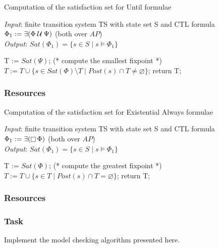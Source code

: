 \documentclass{article}
\begin{document}
\begin{algorithm}[H]
    \caption{Computation of the satisfaction set for Until formulae}
    \hspace*{\algorithmicindent} \emph{Input}: finite transition system TS with state set S and CTL formula $\Phi_1 := \exists (\Phi \mathbin{\mathcal{U}} \Psi)$ (both over $AP$) \\
    \hspace*{\algorithmicindent} \emph{Output}: $Sat(\Phi_1) = \{ s \in S \mid s \vDash \Phi_1 \}$
    \begin{algorithmic}[1]
        \State T := $Sat(\Psi)$; (* compute the smallest fixpoint *)
            \State $ T := T \cup \{ s \in Sat(\Phi) \setminus T \mid Post(s) \cap T \neq \varnothing \} $;
        \EndWhile
    \State return T;
    \end{algorithmic}
\end{algorithm}
\subsubsection{Resources}
\cite[Paragraph 6.4]{BaKa}

\begin{algorithm}[H]
    \caption{Computation of the satisfaction set for Existential Always formulae}
    \hspace*{\algorithmicindent} \emph{Input}: finite transition system TS with state set S and CTL formula $\Phi_1 := \exists (\mathop{\square} \Phi)$ (both over $AP$) \\
    \hspace*{\algorithmicindent} \emph{Output}: $Sat(\Phi_1) = \{ s \in S \mid s \vDash \Phi_1  \}$
    \begin{algorithmic}[1]
        \State T := $Sat(\Phi)$; (* compute the greatest fixpoint *)
            \State $ T := T \cup \{ s \in T \mid Post(s) \cap T = \varnothing \} $;
        \EndWhile
    \State return T;
    \end{algorithmic}
\end{algorithm}
\subsubsection{Resources}
\cite[Paragraph 6.4]{BaKa}

\subsubsection*{Task}
Implement the model checking algorithm presented here.
\end{document}
